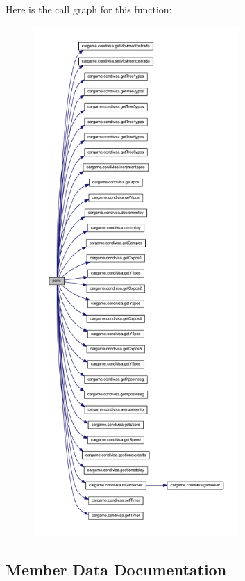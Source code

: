 Here is the call graph for this function\+:
\nopagebreak
\begin{figure}[H]
\begin{center}
\leavevmode
\includegraphics[height=550pt]{classcargame_1_1giocoseparato_a588c03edd1134c68bb729046b366a3c9_cgraph}
\end{center}
\end{figure}


\subsection{Member Data Documentation}
\mbox{\label{classcargame_1_1giocoseparato_a19d12f9f1abcf9721429eb73637ab0ee}} 
